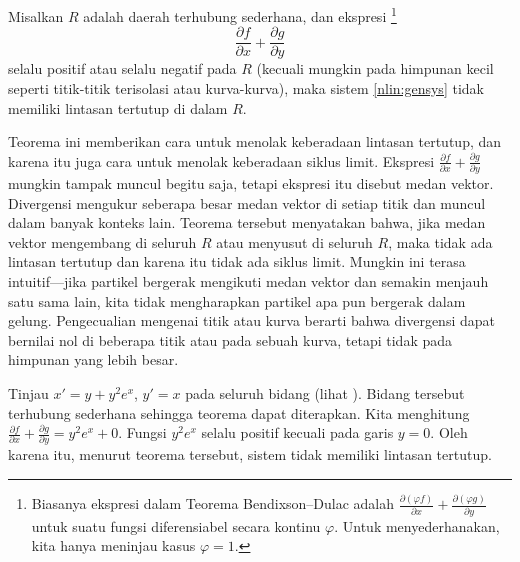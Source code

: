\begin{theorem}%
Misalkan $R$ adalah daerah terhubung sederhana, dan ekspresi%
\footnote{Biasanya ekspresi dalam Teorema Bendixson--Dulac adalah
$\frac{\partial (\varphi f)}{\partial x} + \frac{\partial (\varphi
g)}{\partial y}$
untuk suatu fungsi diferensiabel secara kontinu $\varphi$.
Untuk menyederhanakan,
kita hanya meninjau kasus $\varphi = 1$.}
\begin{equation*}
\frac{\partial f}{\partial x} + \frac{\partial g}{\partial y}
\end{equation*}
selalu positif atau selalu negatif pada $R$ (kecuali mungkin pada himpunan
kecil seperti titik-titik terisolasi atau kurva-kurva), maka sistem
\eqref{nlin:gensys} tidak memiliki lintasan tertutup di dalam $R$.
\end{theorem}

Teorema ini memberikan cara untuk menolak keberadaan lintasan tertutup,
dan karena itu juga cara untuk menolak keberadaan siklus limit.
Ekspresi $\frac{\partial f}{\partial x} + \frac{\partial g}{\partial y}$
mungkin tampak muncul begitu saja, tetapi ekspresi itu disebut
\emph{} medan vektor.
Divergensi mengukur seberapa besar medan vektor  di setiap
titik dan muncul dalam banyak konteks lain.
Teorema tersebut menyatakan bahwa, jika medan vektor mengembang di seluruh
$R$ atau menyusut di seluruh $R$, maka tidak ada lintasan tertutup dan
karena itu tidak ada siklus limit.
Mungkin ini terasa intuitif---jika partikel bergerak mengikuti medan vektor
dan semakin menjauh satu sama lain, kita tidak mengharapkan partikel apa pun
bergerak dalam gelung.
Pengecualian mengenai titik atau kurva berarti bahwa divergensi dapat bernilai
nol di beberapa titik atau pada sebuah kurva, tetapi tidak pada himpunan yang
lebih besar.

\begin{example}
Tinjau $x'=y+y^2e^x$, $y'=x$ pada seluruh bidang (lihat
).
Bidang tersebut terhubung sederhana sehingga teorema dapat diterapkan.
Kita menghitung
$\frac{\partial f}{\partial x} + \frac{\partial g}{\partial y} =
y^2e^x+ 0$. Fungsi $y^2e^x$ selalu positif kecuali pada garis $y=0$.
Oleh karena itu, menurut teorema tersebut, sistem tidak memiliki lintasan
tertutup.
\end{example}

